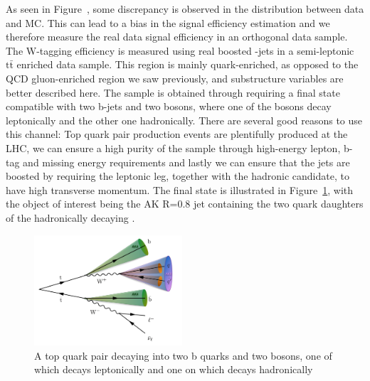 As seen in Figure~\label{fig:wtag}, some discrepancy is observed in the \nsubj distribution between data and MC. This can lead to a bias in the signal efficiency estimation and we therefore measure the real data signal efficiency in an orthogonal data sample.
The W-tagging efficiency is measured using real boosted \PW-jets in a semi-leptonic $\textrm{t}\bar{\textrm{t}}$ enriched data sample. This region is mainly quark-enriched, as opposed to the QCD gluon-enriched region we saw previously, and substructure variables are better described here. The sample is obtained through requiring a final state compatible with two b-jets and two \PW bosons, where one of the bosons decay leptonically and the other one hadronically. There are several good reasons to use this channel: Top quark pair production events are plentifully produced at the LHC, we can ensure a high purity of the sample through high-energy lepton, b-tag and missing energy requirements and lastly we can ensure that the \PW jets are boosted by requiring the leptonic leg, together with the hadronic \PW candidate, to have high transverse momentum. The final state is illustrated in Figure~\ref{fig:search2:ttsemilep}, with the object of interest being the AK R=0.8 jet containing the two quark daughters of the hadronically decaying \PW.
\begin{figure}[htbp]
\centering
\includegraphics[width=0.49\textwidth]{figures/analysis/search2/misc/semileptt.pdf}
\caption{A top quark pair decaying into two b quarks and two \PW bosons, one of which decays leptonically and one on which decays hadronically}
\label{fig:search2:ttsemilep}
\end{figure}

